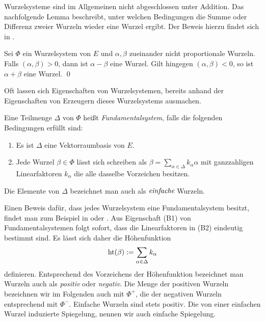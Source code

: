 Wurzelsysteme sind im Allgemeinen nicht abgeschlossen unter Addition. 
Das nachfolgende Lemma beschreibt, unter welchen Bedingungen die Summe oder Differenz zweier Wurzeln wieder eine Wurzel ergibt. Der Beweis hierzu findet sich in \cite[S.45]{humphreys1972introduction}.

\begin{lem}
  \label{lem:sumDiffRoot}
  Sei $\Phi$ ein Wurzelsystem von $E$ und $\alpha, \beta$ zueinander nicht proportionale Wurzeln.
  Falls $(\alpha, \beta) > 0$, dann ist $\alpha - \beta$ eine Wurzel.
  Gilt hingegen $(\alpha, \beta) < 0$, so ist $\alpha + \beta$ eine Wurzel. \qed
\end{lem}

Oft lassen sich Eigenschaften von Wurzelsystemen, bereits anhand der Eigenschaften von Erzeugern dieses Wurzelsystems ausmachen.

\begin{defn}
  Eine Teilmenge $\Delta$ von $\Phi$ heißt \emph{Fundamentalsystem}, falls die folgenden Bedingungen erfüllt sind:
  \begin{enumerate}[(B1)]
    \item Es ist $\Delta$ eine Vektorraumbasis von $E$.
    \item Jede Wurzel $\beta \in \Phi$ lässt sich schreiben als $\beta = \sum_{\alpha \in \Delta} k_\alpha \alpha$ mit ganzzahligen Linearfaktoren $k_\alpha$ die alle dasselbe Vorzeichen besitzen.
  \end{enumerate}
  Die Elemente von $\Delta$ bezeichnet man auch als $\emph{einfache}$ Wurzeln.
\end{defn}

\begin{bem}
  Einen Beweis dafür, dass jedes Wurzelsystem eine Fundamentalsystem besitzt, findet man zum Beispiel in \cite[S.48]{humphreys1972introduction} oder \cite[S.116]{erdmann2006introduction}.
  Aus Eigenschaft (B1) von Fundamentalsystemen folgt sofort, dass die Linearfaktoren in (B2) eindeutig bestimmt sind. 
  Es lässt sich daher die Höhenfunktion 
  \begin{displaymath}
    \operatorname{ht}(\beta) := \sum_{\alpha \in \Delta} k_\alpha 
  \end{displaymath}
  definieren.
  Entsprechend des Vorzeichens der Höhenfunktion bezeichnet man Wurzeln auch als \emph{positiv} oder \emph{negativ}.
  Die Menge der positiven Wurzeln bezeichnen wir im Folgenden auch mit $\Phi^+$, die der negativen Wurzeln entsprechend mit $\Phi^-$.
  Einfache Wurzeln sind stets positiv.
  Die von einer einfachen Wurzel induzierte Spiegelung, nennen wir auch einfache Spiegelung.
\end{bem}


